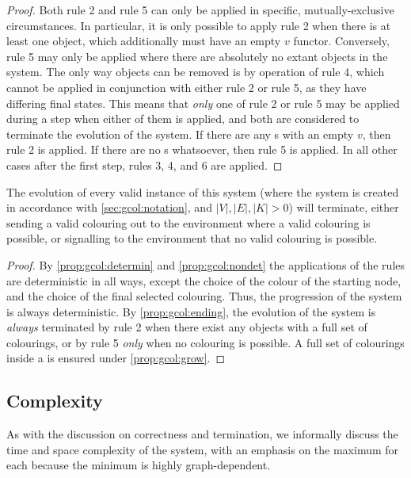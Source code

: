 \begin{proof}
Both rule 2 and rule 5 can only be applied in specific, mutually-exclusive circumstances.  In particular, it is only possible to apply rule 2 when there is at least one \bo{} object, which additionally must have an empty \(v\) functor.  Conversely, rule 5 may only be applied where there are absolutely no extant \bo{} objects in the system.  The only way \bo{} objects can be removed is by operation of rule 4, which cannot be applied in conjunction with either rule 2 or rule 5, as they have differing final states.  This means that \emph{only} one of rule 2 or rule 5 may be applied during a step when either of them is applied, and both are considered to terminate the evolution of the system.  If there are any \bo{}s with an empty \(v\), then rule 2 is applied.  If there are no \bo{}s whatsoever, then rule 5 is applied.  In all other cases after the first step, rules 3, 4, and 6 are applied.
\end{proof}

\begin{theorem}
The evolution of every valid instance of this system (where the system is created in accordance with \autoref{sec:gcol:notation}, and \(|V|, |E|, |K| > 0\)) will terminate, either sending a valid colouring out to the environment where a valid colouring is possible, or signalling to the environment that no valid colouring is possible.
\end{theorem}

\begin{proof}
By \autoref{prop:gcol:determin} and \autoref{prop:gcol:nondet} the applications of the rules are deterministic in all ways, except the choice of the colour of the starting node, and the choice of the final selected colouring.  Thus, the progression of the system is always deterministic.  By \autoref{prop:gcol:ending}, the evolution of the system is \emph{always} terminated by rule 2 when there exist any \bo{} objects with a full set of colourings, or by rule 5 \emph{only} when no colouring is possible.  A full set of colourings inside a \bo{} is ensured under \autoref{prop:gcol:grow}.
\end{proof}

\subsection{Complexity}
As with the discussion on correctness and termination, we informally discuss the time and space complexity of the system, with an emphasis on the maximum for each because the minimum is highly graph-dependent.

